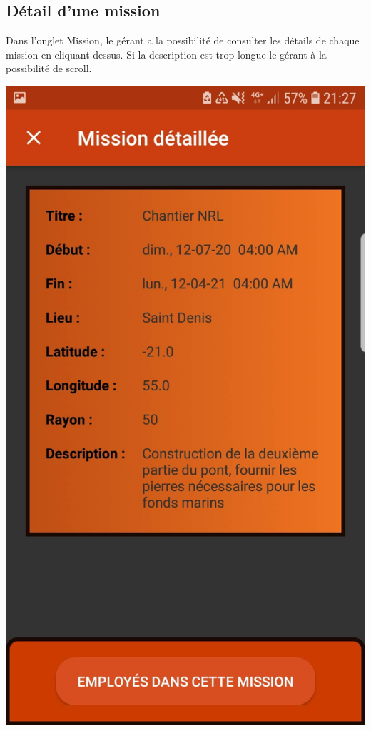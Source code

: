 \documentclass{article}
\begin{document}
\subsection{Détail d'une mission}

Dans l'onglet Mission, le gérant a la possibilité de consulter les détails de chaque mission en cliquant dessus. Si la description est trop longue le gérant à la possibilité de scroll.
\begin{center}
    \includegraphics[scale=0.1]{detailM.jpg}

\end{center}
\end{document}
